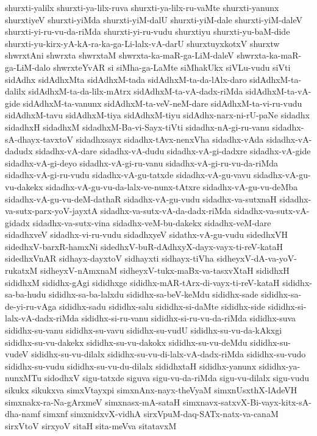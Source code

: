 {shurxti-yalilx
shurxti-ya-lilx-ruva
shurxti-ya-lilx-ru-vaMte
shurxti-yanunx
shurxtiyeV
shurxti-yiMda
shurxti-yiM-dalU
shurxti-yiM-dale
shurxti-yiM-daleV
shurxti-yi-ru-vu-da-riMda
shurxti-yi-ru-vudu
shurxtiyu
shurxti-yu-baM-dide
shurxti-yu-kirx-yA-kA-ra-ka-ga-Li-lalx-vA-darU
shurxtuyxkotxV
shurxtw
shwrxtAni
shwrxta
shwrxtaM
shwrxta-ka-maR-ga-LiM-daleV
shwrxta-ka-maR-ga-LiM-dalo
shwrxteYvAR
si
siMha-ga-LaMte
siMhakUkx
siVLu-vudu
siVti
sidAdhx
sidAdhxMta
sidAdhxM-tada
sidAdhxM-ta-da-lAlx-daro
sidAdhxM-ta-dalilx
sidAdhxM-ta-da-lilx-mAtrx
sidAdhxM-ta-vA-dadx-riMda
sidAdhxM-ta-vA-gide
sidAdhxM-ta-vanunx
sidAdhxM-ta-veV-neM-dare
sidAdhxM-ta-vi-ru-vudu
sidAdhxM-tavu
sidAdhxM-tiya
sidAdhxM-tiyu
sidAdhx-narx-ni-rU-paNe
sidadhx
sidadhxH
sidadhxM
sidadhxM-Ba-vi-Sayx-tiVti
sidadhx-nA-gi-ru-vanu
sidadhx-sA-dhayx-tavxtoV
sidadhxsayx
sidadhx-tAvx-nenxVha
sidadhx-vAda
sidadhx-vA-dadudx
sidadhx-vA-dare
sidadhx-vA-dudu
sidadhx-vA-gi-dadxre
sidadhx-vA-gide
sidadhx-vA-gi-deyo
sidadhx-vA-gi-ru-vanu
sidadhx-vA-gi-ru-vu-da-riMda
sidadhx-vA-gi-ru-vudu
sidadhx-vA-gu-tatxde
sidadhx-vA-gu-vavu
sidadhx-vA-gu-vu-dakekx
sidadhx-vA-gu-vu-da-lalx-ve-nunx-tAtxre
sidadhx-vA-gu-vu-deMba
sidadhx-vA-gu-vu-deM-dathaR
sidadhx-vA-gu-vudu
sidadhx-va-sutxnaH
sidadhx-va-sutx-parx-yoV-jayxtA
sidadhx-va-sutx-vA-da-dadx-riMda
sidadhx-va-sutx-vA-gidadx
sidadhx-va-sutx-vina
sidadhx-veM-bu-dakekx
sidadhx-veM-dare
sidadhxveV
sidadhx-vi-ru-vudu
sidadhxyeV
sidathx-vA-gu-vudu
sidedhxVH
sidedhxV-barxR-hamxNi
sidedhxV-buR-dAdhxyX-dayx-vayx-ti-reV-kataH
sidedhxVnAR
sidhayx-dayxtoV
sidhayxti
sidhayx-tiVha
sidheyxV-dA-va-yoV-rukatxM
sidheyxV-nAmxnaM
sidheyxV-tukx-maBx-va-tasxvXtaH
sididhxH
sididhxM
sididhx-gAgi
sididhxge
sididhx-mAR-tArx-di-vayx-ti-reV-kataH
sididhx-sa-ba-hudu
sididhx-sa-ba-lalxdu
sididhx-sa-beV-keMdu
sididhx-sade
sididhx-sa-de-yi-ru-vAga
sididhx-sadu
sididhx-salu
sididhx-si-daMte
sididhx-side
sididhx-si-lalx-vA-dadx-riMda
sididhx-si-ru-vanu
sididhx-si-ru-vu-da-riMda
sididhx-suva
sididhx-su-vanu
sididhx-su-vavu
sididhx-su-vudU
sididhx-su-vu-da-kAkxgi
sididhx-su-vu-dakekx
sididhx-su-vu-dakokx
sididhx-su-vu-deMdu
sididhx-su-vudeV
sididhx-su-vu-dilalx
sididhx-su-vu-di-lalx-vA-dadx-riMda
sididhx-su-vudo
sididhx-su-vudu
sididhx-su-vu-du-dilalx
sididhxtaH
sididhx-yanunx
sididhx-ya-nunxMTu
sidodhxV
sigu-tatxde
siguva
sigu-vu-da-riMda
sigu-vu-dilalx
sigu-vudu
sikukx
sikukxva
simxVtayxpi
simxnAnx-nayx-theVyaM
simxnUsxthX-lAdeVH
simxnakx-ra-Na-gArxmeV
simxnasx-mA-sataH
simxnavx-satxvX-Bi-vayx-kitx-sA-dha-namf
simxnf
simxnidxvX-vidhA
sirxVpuM-daq-SATx-natx-va-canaM
sirxVtoV
sirxyoV
sitaH
sita-meVva
sitatavxM
}
